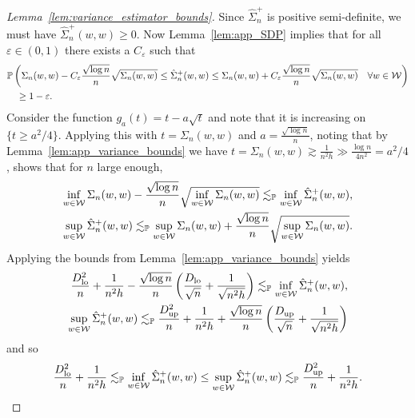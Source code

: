\begin{proof}[Lemma~\ref{lem:variance_estimator_bounds}]

  Since $\hat \Sigma_n^+$ is positive semi-definite,
  we must have $\hat \Sigma_n^+(w,w) \geq 0$.
  Now Lemma~\ref{lem:app_SDP}
  implies that for all $\varepsilon \in (0,1)$
  there exists a $C_\varepsilon$ such that
  \begin{align*}
    &\mathbb{P}\left(
      \Sigma_n(w,w) - C_\varepsilon \frac{\sqrt{\log n}}{n} \sqrt{\Sigma_n(w,w)}
      \leq
      \hat \Sigma_n^+(w,w)
      \leq
      \Sigma_n(w,w) + C_\varepsilon \frac{\sqrt{\log n}}{n} \sqrt{\Sigma_n(w,w)}
      \quad \forall w \in \mathcal{W}
    \right) \\
    &\quad\geq 1-\varepsilon.
  \end{align*}
  Consider the function
  $g_a(t) = t - a \sqrt{t}$
  and note that it is increasing on $\{t \geq a^2/4\}$.
  Applying this with $t = \Sigma_n(w,w)$
  and $a = \frac{\sqrt{\log n}}{n}$,
  noting that by Lemma~\ref{lem:app_variance_bounds} we have
  $t = \Sigma_n(w,w) \gtrsim \frac{1}{n^2h}
  \gg \frac{\log n}{4n^2} = a^2/4$,
  shows that for $n$ large enough,
  \begin{align*}
    \inf_{w \in \mathcal{W}} \Sigma_n(w,w)
    - \frac{\sqrt{\log n}}{n} \sqrt{\inf_{w \in \mathcal{W}} \Sigma_n(w,w)}
    \lesssim_{\mathbb{P}}
    \inf_{w \in \mathcal{W}}\hat \Sigma_n^+(w,w), \\
    \sup_{w \in \mathcal{W}}\hat \Sigma_n^+(w,w)
    \lesssim_{\mathbb{P}}
    \sup_{w \in \mathcal{W}} \Sigma_n(w,w)
    + \frac{\sqrt{\log n}}{n} \sqrt{\sup_{w \in \mathcal{W}} \Sigma_n(w,w)}.
  \end{align*}
  Applying the bounds from Lemma~\ref{lem:app_variance_bounds}
  yields
  \begin{align*}
    \frac{D_{\textup{lo}}^2}{n} + \frac{1}{n^2h}
    - \frac{\sqrt{\log n}}{n}
    \left( \frac{D_{\textup{lo}}}{\sqrt n} + \frac{1}{\sqrt{n^2h}} \right)
    \lesssim_{\mathbb{P}}
    \inf_{w \in \mathcal{W}}\hat \Sigma_n^+(w,w), \\
    \sup_{w \in \mathcal{W}}\hat \Sigma_n^+(w,w)
    \lesssim_{\mathbb{P}}
    \frac{D_{\textup{up}}^2}{n} + \frac{1}{n^2h}
    + \frac{\sqrt{\log n}}{n}
    \left( \frac{D_{\textup{up}}}{\sqrt n} + \frac{1}{\sqrt{n^2h}} \right)
  \end{align*}
  and so
  \begin{align*}
    \frac{D_{\textup{lo}}^2}{n} + \frac{1}{n^2h}
    \lesssim_{\mathbb{P}}
    \inf_{w \in \mathcal{W}}\hat \Sigma_n^+(w,w)
    \leq
    \sup_{w \in \mathcal{W}}\hat \Sigma_n^+(w,w)
    \lesssim_{\mathbb{P}}
    \frac{D_{\textup{up}}^2}{n} + \frac{1}{n^2h}.
  \end{align*}
\end{proof}

